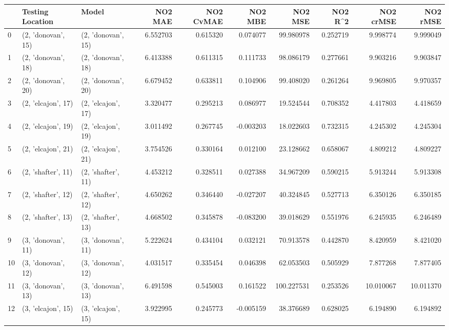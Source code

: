 \begin{tabular}{lllrrrrrrr}
\toprule
{} &    Testing Location &               Model &   NO2 MAE &  NO2 CvMAE &   NO2 MBE &     NO2 MSE &   NO2 R\textasciicircum2 &  NO2 crMSE &   NO2 rMSE \\
\midrule
0  &  (2, 'donovan', 15) &  (2, 'donovan', 15) &  6.552703 &   0.615320 &  0.074077 &   99.980978 &  0.252719 &   9.998774 &   9.999049 \\
1  &  (2, 'donovan', 18) &  (2, 'donovan', 18) &  6.413388 &   0.611315 &  0.111733 &   98.086179 &  0.277661 &   9.903216 &   9.903847 \\
2  &  (2, 'donovan', 20) &  (2, 'donovan', 20) &  6.679452 &   0.633811 &  0.104906 &   99.408020 &  0.261264 &   9.969805 &   9.970357 \\
3  &  (2, 'elcajon', 17) &  (2, 'elcajon', 17) &  3.320477 &   0.295213 &  0.086977 &   19.524544 &  0.708352 &   4.417803 &   4.418659 \\
4  &  (2, 'elcajon', 19) &  (2, 'elcajon', 19) &  3.011492 &   0.267745 & -0.003203 &   18.022603 &  0.732315 &   4.245302 &   4.245304 \\
5  &  (2, 'elcajon', 21) &  (2, 'elcajon', 21) &  3.754526 &   0.330164 &  0.012100 &   23.128662 &  0.658067 &   4.809212 &   4.809227 \\
6  &  (2, 'shafter', 11) &  (2, 'shafter', 11) &  4.453212 &   0.328511 &  0.027388 &   34.967209 &  0.590215 &   5.913244 &   5.913308 \\
7  &  (2, 'shafter', 12) &  (2, 'shafter', 12) &  4.650262 &   0.346440 & -0.027207 &   40.324845 &  0.527713 &   6.350126 &   6.350185 \\
8  &  (2, 'shafter', 13) &  (2, 'shafter', 13) &  4.668502 &   0.345878 & -0.083200 &   39.018629 &  0.551976 &   6.245935 &   6.246489 \\
9  &  (3, 'donovan', 11) &  (3, 'donovan', 11) &  5.222624 &   0.434104 &  0.032121 &   70.913578 &  0.442870 &   8.420959 &   8.421020 \\
10 &  (3, 'donovan', 12) &  (3, 'donovan', 12) &  4.031517 &   0.335454 &  0.046398 &   62.053503 &  0.505929 &   7.877268 &   7.877405 \\
11 &  (3, 'donovan', 13) &  (3, 'donovan', 13) &  6.491598 &   0.545003 &  0.161522 &  100.227531 &  0.253526 &  10.010067 &  10.011370 \\
12 &  (3, 'elcajon', 15) &  (3, 'elcajon', 15) &  3.922995 &   0.245773 & -0.005159 &   38.376689 &  0.628025 &   6.194890 &   6.194892 \\

\end{tabular}
